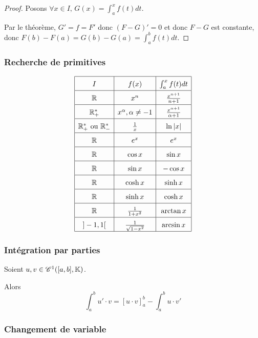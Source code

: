
\begin{proof}
    Posons $\forall x \in I, \, G(x) = \int_a^x f(t) dt$.

    Par le théorème, $G' = f = F'$ donc $(F - G)' = 0$ et donc $F - G$ est constante, 
    donc $F(b) - F(a) = G(b) - G(a) = \int_a^b f(t) dt$.
\end{proof}


\subsubsection{Recherche de primitives }

$$\renewcommand{\arraystretch}{1.6}
\begin{array}{|c|c|c|}
    \hline
    I & f(x) & \int_{a }^{x } f(t) dt \\
    \hline
    \R & x^n & \frac{x^{n+1}}{n + 1} \\
    \hline
    \R^*_+ & x^\alpha, \alpha \neq -1 & \frac{x^{\alpha + 1}}{\alpha + 1} \\
    \hline
    \R^*_+ \text{ ou } \R_-^*& \frac 1 x & \ln |x| \\
    \hline
    \R & e^x & e^x \\
    \hline
    \R & \cos x & \sin x \\
    \hline
    \R & \sin x & -\cos x \\
    \hline
    \R & \cosh x & \sinh x \\
    \hline
    \R & \sinh x & \cosh x \\
    \hline
    \R & \frac 1 {1 + x^2} & \arctan x \\
    \hline
    ]-1, 1[ & \frac 1 {\sqrt{1 - x^2}} & \arcsin x\\
    \hline
\end{array}$$

\subsubsection{Intégration par parties }

Soient $u, v \in \mathscr C^1([a, b], \mathbb{K})$.

Alors $$\int_{a }^{b } u'\cdot v = \left[ u \cdot v \right]_{a }^{b } - \int_{a }^{b } u \cdot v'$$

\subsubsection{Changement de variable }

